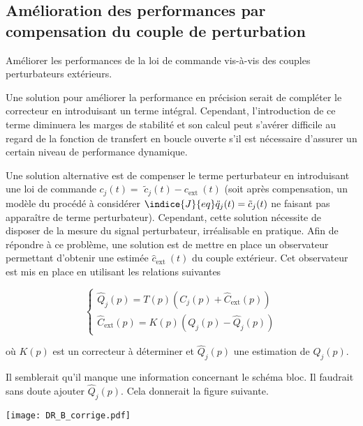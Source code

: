 \subsection{Amélioration des performances par compensation du couple de perturbation}
\begin{obj}
Améliorer les performances de la loi de commande vis-à-vis des couples perturbateurs extérieurs.
\end{obj}

\ifprof
\else

Une solution pour améliorer la performance en précision serait de compléter le correcteur en introduisant un terme intégral. Cependant, l'introduction de ce terme diminuera les marges de stabilité et son calcul peut s'avérer difficile au regard de la fonction de transfert en boucle ouverte s'il est nécessaire d'assurer un certain niveau de performance dynamique.

Une solution alternative est de compenser le terme perturbateur en introduisant une loi de commande $c_{j}(t)=$ $\tilde{c}_{j}(t)-c_{\text {ext }}(t)$ (soit après compensation, un modèle du procédé à considérer $\indice{J}{eq} \ddot{q}_{j}(t)=\tilde{c}_{j}(t)$ ne faisant pas apparaître de terme perturbateur). Cependant, cette solution nécessite de disposer de la mesure du signal perturbateur, irréalisable en pratique. Afin de répondre à ce problème, une solution est de mettre en place un observateur permettant d'obtenir une estimée $\hat{c}_{\text {ext }}(t)$ du couple extérieur. Cet observateur est mis en place en utilisant les relations suivantes

$$
\left\{\begin{array}{l}
\hat{Q}_{j}(p)=T(p)\left(C_{j}(p)+\hat{C}_{\mathrm{ext}}(p)\right) \\
\hat{C}_{\mathrm{ext}}(p)=K(p)\left(Q_{j}(p)-\hat{Q}_{j}(p)\right)
\end{array}\right.
$$

où $K(p)$ est un correcteur à déterminer et $\hat{Q}_{j}(p)$ une estimation de $Q_{j}(p)$.\\
\fi

\ifprof
\begin{corrige}
\begin{rem}
Il semblerait qu'il manque une information concernant le schéma bloc. Il faudrait sans doute ajouter $\hat{Q}_j(p)$. Cela donnerait la figure suivante.
\end{rem}

\begin{center}
\texttt{[image: DR\_B\_corrige.pdf]}
\end{center}
\end{corrige}
\else
\fi

